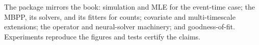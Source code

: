 \begin{recap}
The package mirrors the book: simulation and MLE for the event-time case; the MBPP,
its solvers, and its fitters for counts; covariate and multi-timescale extensions;
the operator and neural-solver machinery; and goodness-of-fit. Experiments
reproduce the figures and tests certify the claims.
\end{recap}

